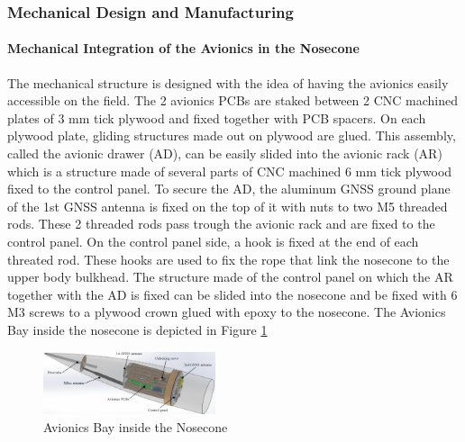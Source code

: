 \subsubsection{Mechanical Design and Manufacturing}
\paragraph{Mechanical Integration of the Avionics in the Nosecone}
The mechanical structure is designed with the idea of having the avionics easily accessible on the field. The 2 avionics PCBs are staked between 2 CNC machined plates of 3 mm tick plywood and fixed together with PCB spacers. On each plywood plate, gliding structures made out on plywood are glued. This assembly, called the avionic drawer (AD), can be easily slided into the avionic rack (AR) which is a structure made of several parts of CNC machined 6 mm tick plywood fixed to the control panel. To secure the AD, the aluminum GNSS ground plane of the 1st GNSS antenna is fixed on the top of it with nuts to two M5 threaded rods. These 2 threaded rods pass trough the avionic rack and are fixed to the control panel. On the control panel side, a hook is fixed at the end of each threated rod. These hooks are used to fix the rope that link the nosecone to the upper body bulkhead. The structure made of the control panel on which the AR together with the AD is fixed can be slided into the nosecone and be fixed with 6 M3 screws to a plywood crown glued with epoxy to the nosecone. The Avionics Bay inside the nosecone is depicted in Figure \ref{f:avionics_bay}

  \begin{figure}[h!]
 	\centering
        \includegraphics[width=0.45\textwidth]{img/AV_FIG_CAD_nosecone.PNG}
        \caption{Avionics Bay inside the Nosecone}
        \label{f:avionics_bay}
 \end{figure}
 
